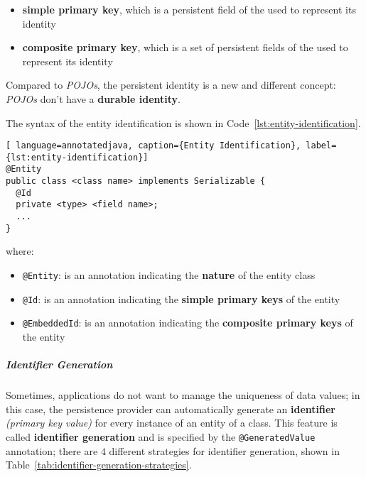 \documentclass[english]{article}
\begin{document}
\begin{itemize}
  \item \textbf{simple primary key}, which is a persistent field of the \javab used to represent its identity
  \item \textbf{composite primary key}, which is a set of persistent fields of the \javab used to represent its identity
\end{itemize}

Compared to \textit{POJOs}, the persistent identity is a new and different concept: \textit{POJOs} don't have a \textbf{durable identity}.

The syntax of the entity identification is shown in Code~\ref{lst:entity-identification}.

\begin{lstlisting}[ language=annotatedjava, caption={Entity Identification}, label={lst:entity-identification}]
@Entity
public class <class name> implements Serializable {
  @Id
  private <type> <field name>;
  ...
}
\end{lstlisting}

where:
\begin{itemize}[label=\textbf{\texttt{>}}]
  \item \texttt{@Entity}: is an annotation indicating the \textbf{nature} of the entity class
  \item \texttt{@Id}: is an annotation indicating the \textbf{simple primary keys} of the entity
  \item \texttt{@EmbeddedId}: is an annotation indicating the \textbf{composite primary keys} of the entity
\end{itemize}

\subparagraph*{Identifier Generation}
Sometimes, applications do not want to manage the uniqueness of data values;
in this case, the persistence provider can automatically generate an \textbf{identifier} \textit{(primary key value)} for every instance of an entity of a class.
This feature is called \textbf{identifier generation} and is specified by the \texttt{@GeneratedValue} annotation;
there are \(4\) different strategies for identifier generation, shown in Table~\ref{tab:identifier-generation-strategies}.
\end{document}
